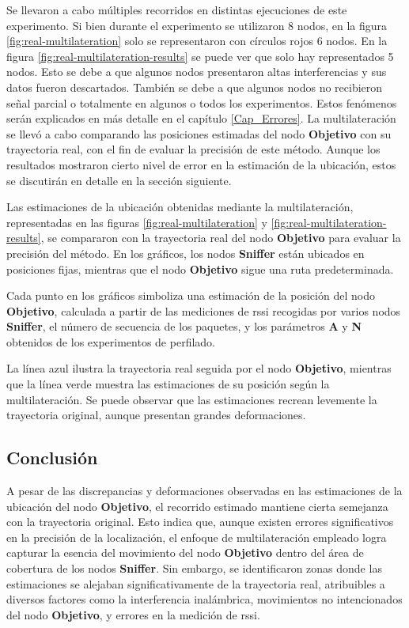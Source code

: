 Se llevaron a cabo múltiples recorridos en distintas ejecuciones de este experimento. Si bien durante el experimento se utilizaron 8 nodos, en la figura \ref{fig:real-multilateration} solo se representaron con círculos rojos 6 nodos. En la figura \ref{fig:real-multilateration-results} se puede ver que solo hay representados 5 nodos. Esto se debe a que algunos nodos presentaron altas interferencias y sus datos fueron descartados. También se debe a que algunos nodos no recibieron señal parcial o totalmente en algunos o todos los experimentos. Estos fenómenos serán explicados en más detalle en el capítulo \ref{Cap_Errores}.
La multilateración se llevó a cabo comparando las posiciones estimadas del nodo \textbf{Objetivo} con su trayectoria real, con el fin de evaluar la precisión de este método. Aunque los resultados mostraron cierto nivel de error en la estimación de la ubicación, estos se discutirán en detalle en la sección siguiente.


Las estimaciones de la ubicación obtenidas mediante la multilateración, representadas en las figuras \ref{fig:real-multilateration} y \ref{fig:real-multilateration-results}, se compararon con la trayectoria real del nodo \textbf{Objetivo} para evaluar la precisión del método. En los gráficos, los nodos \textbf{Sniffer} están ubicados en posiciones fijas, mientras que el nodo \textbf{Objetivo} sigue una ruta predeterminada.

Cada punto en los gráficos simboliza una estimación de la posición del nodo \textbf{Objetivo}, calculada a partir de las mediciones de \acs{rssi} recogidas por varios nodos \textbf{Sniffer}, el número de secuencia de los paquetes, y los parámetros \textbf{A} y \textbf{N} obtenidos de los experimentos de perfilado.

La línea azul ilustra la trayectoria real seguida por el nodo \textbf{Objetivo}, mientras que la línea verde muestra las estimaciones de su posición según la multilateración. Se puede observar que las estimaciones recrean levemente la trayectoria original, aunque presentan grandes deformaciones.


\subsection{Conclusión}

A pesar de las discrepancias y deformaciones observadas en las estimaciones de la ubicación del nodo \textbf{Objetivo}, el recorrido estimado mantiene cierta semejanza con la trayectoria original. Esto indica que, aunque existen errores significativos en la precisión de la localización, el enfoque de multilateración empleado logra capturar la esencia del movimiento del nodo \textbf{Objetivo} dentro del área de cobertura de los nodos \textbf{Sniffer}. Sin embargo, se identificaron zonas donde las estimaciones se alejaban significativamente de la trayectoria real, atribuibles a diversos factores como la interferencia inalámbrica, movimientos no intencionados del nodo \textbf{Objetivo}, y errores en la medición de \acs{rssi}.


